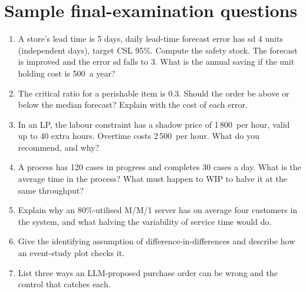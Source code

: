 \section{Sample final-examination questions}
\begin{enumerate}[label=\textbf{Q\arabic*.},leftmargin=2.4em]
\item A store's lead time is 5 days, daily lead-time forecast error has sd 4 units (independent days), target CSL 95\%.
Compute the safety stock. The forecast is improved and the error sd falls to 3. What is the annual saving if the
unit holding cost is 500\xaf\ a year?
\item The critical ratio for a perishable item is 0.3. Should the order be above or below the median forecast? Explain
with the cost of each error.
\item In an LP, the labour constraint has a shadow price of 1\,800\xaf\ per hour, valid up to 40 extra hours. Overtime
costs 2\,500\xaf\ per hour. What do you recommend, and why?
\item A process has 120 cases in progress and completes 30 cases a day. What is the average time in the process? What
must happen to WIP to halve it at the same throughput?
\item Explain why an 80\%-utilised M/M/1 server has on average four customers in the system, and what halving the variability
of service time would do.
\item Give the identifying assumption of difference-in-differences and describe how an event-study plot checks it.
\item List three ways an LLM-proposed purchase order can be wrong and the control that catches each.
\end{enumerate}
